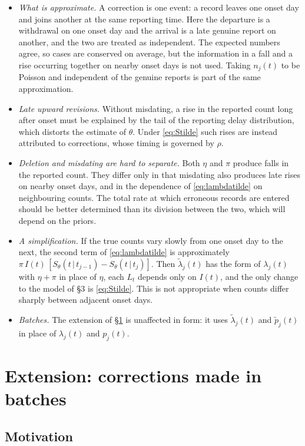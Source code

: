 \documentclass[11pt,a4paper]{article}
\newcommand{\given}{\,|\,}
\begin{document}
\begin{itemize}[itemsep=2pt]
\item \emph{What is approximate.} A correction is one event: a record leaves
one onset day and joins another at the same reporting time. Here the departure
is a withdrawal on one onset day and the arrival is a late genuine report on
another, and the two are treated as independent. The expected numbers agree,
so cases are conserved on average, but the information in a fall and a rise
occurring together on nearby onset days is not used. Taking $n_j(t)$ to be
Poisson and independent of the genuine reports is part of the same
approximation.
\item \emph{Late upward revisions.} Without misdating, a rise in the reported
count long after onset must be explained by the tail of the reporting delay
distribution, which distorts the estimate of $\theta$. Under
\eqref{eq:Stilde} such rises are instead attributed to corrections, whose
timing is governed by $\rho$.
\item \emph{Deletion and misdating are hard to separate.} Both $\eta$ and $\pi$
produce falls in the reported count. They differ only in that misdating also
produces late rises on nearby onset days, and in the dependence of
\eqref{eq:lambdatilde} on neighbouring counts. The total rate at which
erroneous records are entered should be better determined than its division
between the two, which will depend on the priors.
\item \emph{A simplification.} If the true counts vary slowly from one onset
day to the next, the second term of \eqref{eq:lambdatilde} is approximately
$\pi\,I(t)\,[S_\theta(t\given t_{j-1})-S_\theta(t\given t_j)]$. Then
$\tilde\lambda_j(t)$ has the form of $\lambda_j(t)$ with $\eta+\pi$ in place of
$\eta$, each $L_t$ depends only on $I(t)$, and the only change to the model of
\S3 is \eqref{eq:Stilde}. This is not appropriate when counts differ sharply
between adjacent onset days.
\item \emph{Batches.} The extension of \S\ref{sec:batches} is unaffected in
form: it uses $\tilde\lambda_j(t)$ and $\tilde p_j(t)$ in place of
$\lambda_j(t)$ and $p_j(t)$.
\end{itemize}

\section{Extension: corrections made in batches}\label{sec:batches}

\subsection{Motivation}
\end{document}
